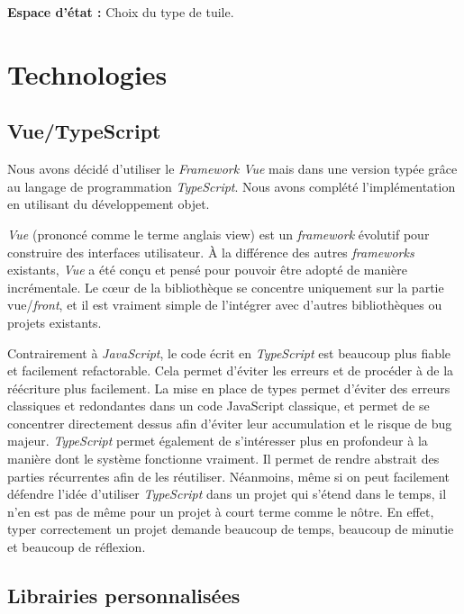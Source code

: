 \documentclass[a4paper, 12pt]{report}
\begin{document}
\textbf{Espace d'état :} Choix du type de tuile.

\chapter{Technologies}

\section{Vue/TypeScript}

\tabto{1cm}Nous avons décidé d'utiliser le \textit{Framework Vue} mais dans une version typée grâce au
langage de programmation \textit{TypeScript}. Nous avons complété l'implémentation en utilisant du développement objet.

\vspace{0.5cm}

\tabto{1cm} \textit{Vue} (prononcé comme le terme anglais view) est un \textit{framework} évolutif pour construire des
interfaces utilisateur. À la différence des autres \textit{frameworks} existants, \textit{Vue} a été conçu et pensé
pour pouvoir être adopté de manière incrémentale. Le cœur de la bibliothèque se concentre uniquement
sur la partie vue/\textit{front}, et il est vraiment simple de l’intégrer avec d’autres bibliothèques ou projets
existants.

\vspace{0.5cm}

\tabto{1cm} Contrairement à \textit{JavaScript}, le code écrit en \textit{TypeScript} est beaucoup plus fiable et facilement refactorable. 
Cela permet d'éviter les erreurs et de procéder à de la réécriture plus facilement.
La mise en place de types permet d'éviter des erreurs classiques et redondantes dans un code JavaScript classique,
et permet de se concentrer directement dessus afin d'éviter leur accumulation et le risque de bug majeur.
\tabto{1cm} \textit{TypeScript} permet également de s'intéresser plus en profondeur à la manière dont le système fonctionne vraiment.
Il permet de rendre abstrait des parties récurrentes afin de les réutiliser.
\tabto{1cm} Néanmoins, même si on peut facilement défendre l'idée d'utiliser \textit{TypeScript} dans un projet qui s'étend dans
le temps, il n'en est pas de même pour un projet à court terme comme le nôtre. En effet, typer correctement un projet
demande beaucoup de temps, beaucoup de minutie et beaucoup de réflexion.

\section{Librairies personnalisées}
\end{document}
